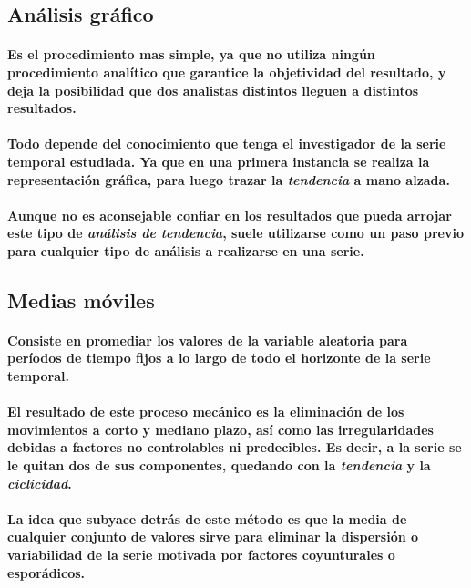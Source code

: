 \subsection{Análisis gráfico}
\label{sec:AnalisisGraficoDeLaTendenciaEnSeriesTemporales}
\paragraph{
Es el procedimiento mas simple, ya que no utiliza ningún procedimiento analítico que garantice la objetividad del resultado, y deja la posibilidad que dos analistas distintos lleguen a distintos resultados.
}
\paragraph{
Todo depende del conocimiento que tenga el investigador de la serie temporal estudiada. Ya que en una primera instancia se realiza la representación gráfica, para luego trazar la \emph{tendencia} a mano alzada.
}
\paragraph{
Aunque no es aconsejable confiar en los resultados que pueda arrojar este tipo de \emph{análisis de tendencia}, suele utilizarse como un paso previo para cualquier tipo de análisis a realizarse en una serie.
}


\subsection{Medias móviles}
\paragraph{
Consiste en promediar los valores de la variable aleatoria para períodos de tiempo fijos a lo largo de todo el horizonte de la serie temporal.
}
\paragraph*{
El resultado de este proceso mecánico es la eliminación de los movimientos a corto y mediano plazo, así como las irregularidades debidas a factores no controlables ni predecibles. Es decir, a la serie se le quitan dos de sus componentes, quedando con la \emph{tendencia} y la \emph{ciclicidad}\footnotemark[1].
}
\paragraph{
La idea que subyace detrás de este método es que la media de cualquier conjunto de valores sirve para eliminar la dispersión o variabilidad de la serie motivada por factores coyunturales o esporádicos.
}

